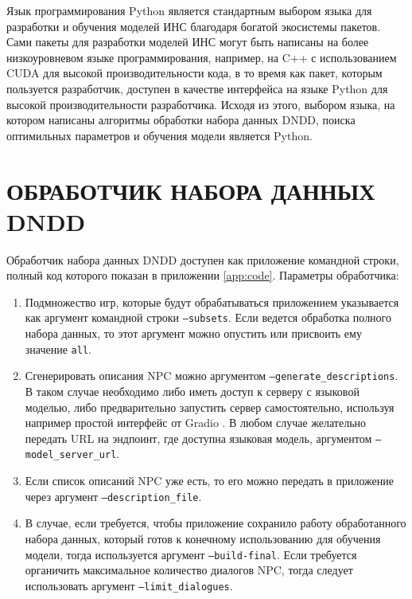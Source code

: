Язык программирования Python \cite{python-lang-site} является стандартным выбором языка для разработки и обучения моделей ИНС благодаря богатой экосистемы пакетов. Сами пакеты для разработки моделей ИНС могут быть написаны на более низкоуровневом языке программирования, например, на C++ \cite{cpp-docs} с использованием CUDA \cite{cuda-docs} для высокой производительности кода, в то время как пакет, которым пользуется разработчик, доступен в качестве интерфейса на языке Python для высокой производительности разработчика. Исходя из этого, выбором языка, на котором написаны алгоритмы обработки набора данных DNDD, поиска оптимильных параметров и обучения модели является Python.

\section{ОБРАБОТЧИК НАБОРА ДАННЫХ DNDD}
Обработчик набора данных DNDD доступен как приложение командной строки, полный код которого показан в приложении \ref{app:code}. Параметры обработчика:
\begin{enumerate}
    \item Подмножество игр, которые будут обрабатываться приложением указывается как аргумент командной строки \texttt{--subsets}. Если ведется обработка полного набора данных, то этот аргумент можно опустить или присвоить ему значение \texttt{all}.
    \item Сгенерировать описания NPC можно аргументом \texttt{--generate\_descriptions}. В таком случае необходимо либо иметь доступ к серверу с языковой моделью, либо предварительно запустить сервер самостоятельно, используя например простой интерфейс от Gradio \cite{gradio-docs}. В любом случае желательно передать URL на эндпоинт, где доступна языковая модель, аргументом \texttt{--model\_server\_url}.
    \item Если список описаний NPC уже есть, то его можно передать в приложение через аргумент \texttt{--description\_file}.
    \item В случае, если требуется, чтобы приложение сохранило работу обработанного набора данных, который готов к конечному использованию для обучения модели, тогда используется аргумент \texttt{--build-final}. Если требуется органичить максимальное количество диалогов NPC, тогда следует использовать аргумент \texttt{--limit\_dialogues}.
\end{enumerate}

